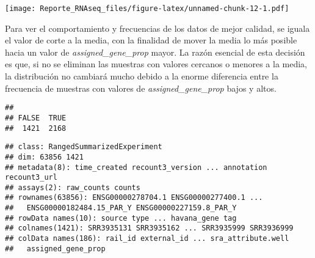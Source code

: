 \documentclass[
]{article}
\newenvironment{Shaded}{\begin{snugshade}}{\end{snugshade}}
\newcommand{\CommentTok}[1]{\textcolor[rgb]{0.56,0.35,0.01}{\textit{#1}}}
\newcommand{\FunctionTok}[1]{\textcolor[rgb]{0.00,0.00,0.00}{#1}}
\newcommand{\NormalTok}[1]{#1}
\newcommand{\OtherTok}[1]{\textcolor[rgb]{0.56,0.35,0.01}{#1}}
\newcommand{\SpecialCharTok}[1]{\textcolor[rgb]{0.00,0.00,0.00}{#1}}
\newcommand{\StringTok}[1]{\textcolor[rgb]{0.31,0.60,0.02}{#1}}
\begin{document}
\texttt{[image: Reporte\_RNAseq\_files/figure-latex/unnamed-chunk-12-1.pdf]}

Para ver el comportamiento y frecuencias de los datos de mejor calidad,
se iguala el valor de corte a la media, con la finalidad de mover la
media lo más posible hacia un valor de \emph{assigned\_gene\_prop}
mayor. La razón esencial de esta decisión es que, si no se eliminan las
muestras con valores cercanos o menores a la media, la distribución no
cambiará mucho debido a la enorme diferencia entre la frecuencia de
muestras con valores de \emph{assigned\_gene\_prop} bajos y altos.

\begin{Shaded}
\end{Shaded}

\begin{verbatim}
## 
## FALSE  TRUE 
##  1421  2168
\end{verbatim}

\begin{Shaded}
\end{Shaded}

\begin{verbatim}
## class: RangedSummarizedExperiment 
## dim: 63856 1421 
## metadata(8): time_created recount3_version ... annotation recount3_url
## assays(2): raw_counts counts
## rownames(63856): ENSG00000278704.1 ENSG00000277400.1 ...
##   ENSG00000182484.15_PAR_Y ENSG00000227159.8_PAR_Y
## rowData names(10): source type ... havana_gene tag
## colnames(1421): SRR3935131 SRR3935162 ... SRR3935999 SRR3936999
## colData names(186): rail_id external_id ... sra_attribute.well
##   assigned_gene_prop
\end{verbatim}
\end{document}
